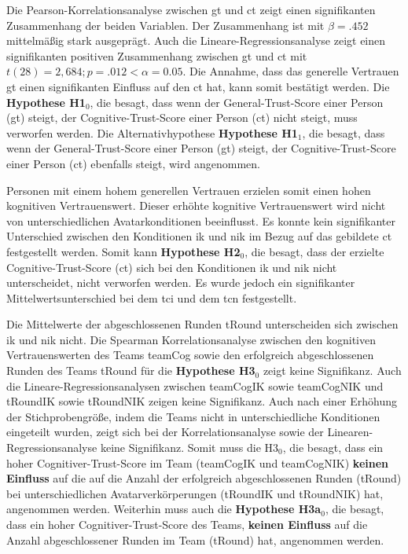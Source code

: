 \documentclass[a4paper,11pt]{article}%
\renewcommand{\\}{\vspace*{0.5\baselineskip} \newline}
\begin{document}
Die Pearson-Korrelationsanalyse zwischen \ac{gt} und \ac{ct} zeigt einen signifikanten Zusammenhang der beiden Variablen. Der Zusammenhang ist mit $\beta = .452$ mittelmäßig stark ausgeprägt. Auch die Lineare-Regressionsanalyse zeigt einen signifikanten positiven Zusammenhang zwischen \ac{gt} und \ac{ct} mit $t(28) = 2,684; p = .012 < \alpha = 0.05$.
Die Annahme, dass das generelle Vertrauen \ac{gt} einen signifikanten Einfluss auf den \ac{ct} hat, kann somit bestätigt werden. Die \textbf{Hypothese H1$_{0}$}, die besagt, dass wenn der General-Trust-Score einer Person (\ac{gt}) steigt, der Cognitive-Trust-Score einer Person (\ac{ct}) nicht steigt, muss verworfen werden. Die Alternativhypothese \textbf{Hypothese H1$_{1}$}, die besagt, dass wenn der General-Trust-Score einer Person (\ac{gt}) steigt, der Cognitive-Trust-Score einer Person (\ac{ct}) ebenfalls steigt, wird angenommen.

Personen mit einem hohem generellen Vertrauen erzielen somit einen hohen kognitiven Vertrauenswert. Dieser erhöhte kognitive Vertrauenswert wird nicht von unterschiedlichen Avatarkonditionen beeinflusst. Es konnte kein signifikanter Unterschied zwischen den Konditionen \ac{ik} und \ac{nik} im Bezug auf das gebildete \ac{ct} festgestellt werden. Somit kann \textbf{Hypothese H2$_{0}$}, die besagt, dass der erzielte Cognitive-Trust-Score (\ac{ct}) sich bei den Konditionen \ac{ik} und \ac{nik} nicht unterscheidet, nicht verworfen werden.
Es wurde jedoch ein signifikanter Mittelwertsunterschied bei dem \ac{tci} und dem \ac{tcn} festgestellt.

Die Mittelwerte der abgeschlossenen Runden \ac{tRound} unterscheiden sich zwischen \ac{ik} und \ac{nik} nicht.
Die Spearman Korrelationsanalyse zwischen den kognitiven Vertrauenswerten des Teams \ac{teamCog} sowie den erfolgreich abgeschlossenen Runden des Teams \ac{tRound} für die \textbf{Hypothese H3$_{0}$} zeigt keine Signifikanz.
Auch die Lineare-Regressionsanalysen zwischen \ac{teamCogIK} sowie \ac{teamCogNIK} und \ac{tRoundIK} sowie \ac{tRoundNIK} zeigen keine Signifikanz. Auch nach einer Erhöhung der Stichprobengröße, indem die Teams nicht in unterschiedliche Konditionen eingeteilt wurden, zeigt sich bei der Korrelationsanalyse sowie der Linearen-Regressionsanalyse keine Signifikanz. Somit muss die H3$_{0}$, die besagt, dass ein hoher Cognitiver-Trust-Score im Team (\ac{teamCogIK} und \ac{teamCogNIK})  \textbf{keinen Einfluss} auf die auf die Anzahl der erfolgreich abgeschlossenen Runden (\ac{tRound}) bei unterschiedlichen Avatarverkörperungen (\ac{tRoundIK} und \ac{tRoundNIK}) hat, angenommen werden.
Weiterhin muss auch die \textbf{Hypothese H3a$_{0}$}, die besagt, dass ein hoher Cognitiver-Trust-Score des Teams, \textbf{keinen Einfluss} auf die Anzahl abgeschlossener Runden im Team (\ac{tRound}) hat, angenommen werden.
\end{document}
